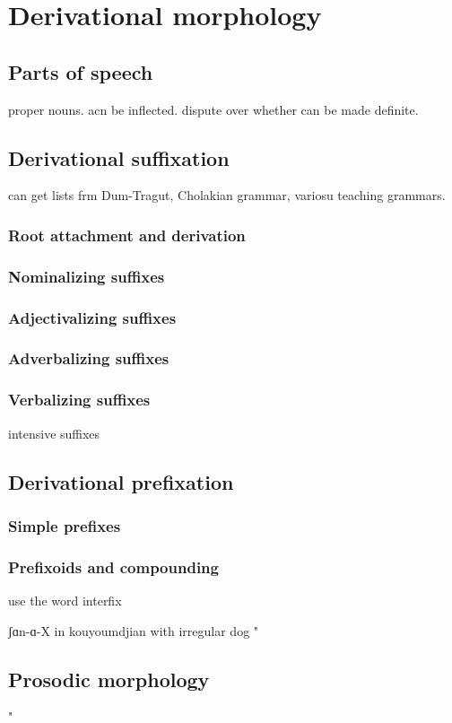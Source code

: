 

\part{Derivational morphology}
\chapter{Parts of speech}
proper nouns. acn be inflected. dispute over whether can be made definite.
\chapter{Derivational suffixation}
can get lists frm Dum-Tragut, Cholakian grammar, variosu teaching grammars.
\section{Root attachment and derivation}
\section{Nominalizing suffixes}
\section{Adjectivalizing suffixes}
\section{Adverbalizing suffixes}
\section{Verbalizing suffixes}

intensive suffixes
\chapter{Derivational prefixation}
\section{Simple prefixes}
\section{Prefixoids  and compounding}
use the word interfix

ʃɑn-ɑ-X in kouyoumdjian with irregular dog
" 	\chapter{Prosodic morphology}"
